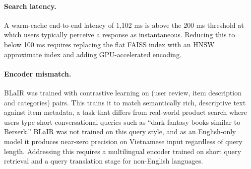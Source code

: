 \paragraph{Search latency.}
A warm-cache end-to-end latency of 1{,}102 ms is above the 200 ms threshold at which users typically perceive a response as instantaneous.
Reducing this to below 100 ms requires replacing the flat FAISS index with an HNSW approximate index and adding GPU-accelerated encoding.

\paragraph{Encoder mismatch.}
BLaIR was trained with contrastive learning on (user review, item description and categories) pairs.
This trains it to match semantically rich, descriptive text against item metadata, a task that differs from real-world product search where users type short conversational queries such as ``dark fantasy books similar to Berserk.''
BLaIR was not trained on this query style, and as an English-only model it produces near-zero precision on Vietnamese input regardless of query length.
Addressing this requires a multilingual encoder trained on short query retrieval and a query translation stage for non-English languages.

